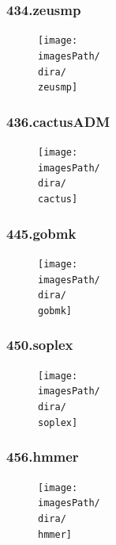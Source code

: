 \documentclass[12pt,a4paper]{article}
\newcommand{\imagesPath}{/home/nick/arch-ntua/ex02/graphs}
\newcommand{\zeusmp}{434.zeusmp.cslab_branch_predictors.out.pdf}
\newcommand{\cactus}{436.cactusADM.cslab_branch_predictors.out.pdf}
\newcommand{\gobmk}{445.gobmk.cslab_branch_predictors.out.pdf}
\newcommand{\soplex}{450.soplex.cslab_branch_predictors.out.pdf}
\newcommand{\hmmer}{456.hmmer.cslab_branch_predictors.out.pdf}
\newcommand{\dira}{4.1}
\begin{document}
			\subsubsection{434.zeusmp}
				\begin{figure}[H]
					\begin{center}
						\texttt{[image: \\imagesPath/\\dira/\\zeusmp]}
					\end{center}
				\end{figure}
			
			\subsubsection{436.cactusADM}
				\begin{figure}[H]
					\begin{center}
						\texttt{[image: \\imagesPath/\\dira/\\cactus]}
					\end{center}
				\end{figure}
			
			\subsubsection{445.gobmk}
				\begin{figure}[H]
					\begin{center}
						\texttt{[image: \\imagesPath/\\dira/\\gobmk]}
					\end{center}
				\end{figure}
			
			\subsubsection{450.soplex}
				\begin{figure}[H]
					\begin{center}
						\texttt{[image: \\imagesPath/\\dira/\\soplex]}
					\end{center}
				\end{figure}
							
			\subsubsection{456.hmmer}
				\begin{figure}[H]
					\begin{center}
						\texttt{[image: \\imagesPath/\\dira/\\hmmer]}
					\end{center}
				\end{figure}
			
\end{document}
